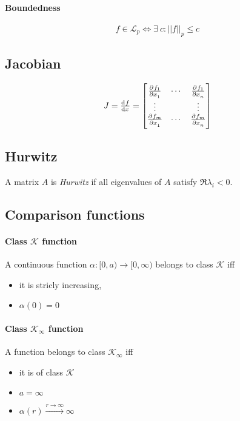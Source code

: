 \paragraph{Boundedness}
\begin{equation}
	f \in \mathcal{L}_p \Leftrightarrow \exists \: c : ||f||_p \leq c
\end{equation}

\subsection{Jacobian}
\begin{equation}
	J
	=
	\od{f}{x}
	=
	\begin{bmatrix}
		\pd{f_1}{x_1} & \cdots & \pd{f_1}{x_n} \\
		\vdots        &        & \vdots        \\
		\pd{f_m}{x_1} & \cdots & \pd{f_m}{x_n}
	\end{bmatrix}
\end{equation}

\subsection{Hurwitz}
A matrix $A$ is \emph{Hurwitz} if all eigenvalues of $A$ satisfy $\Re \lambda_i < 0$.

\subsection{Comparison functions}
\paragraph{Class $\mathcal{K}$ function}
A continuous function $\alpha : [0,a) \rightarrow [0, \infty)$ belongs to class $\mathcal{K}$ iff
\begin{itemize}
	\item it is stricly increasing,
	\item $\alpha(0) = 0$
\end{itemize}

\paragraph{Class $\mathcal{K}_\infty$ function}
A function belongs to class $\mathcal{K}_\infty$ iff
\begin{itemize}
	\item it is of class $\mathcal{K}$
	\item $a = \infty$
	\item $\alpha(r) \xrightarrow{r \rightarrow \infty} \infty$
\end{itemize}

